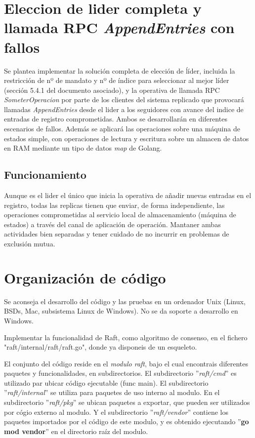 \documentclass{unizarpractice}
\begin{document}
\section{Eleccion de lider completa y llamada RPC \textit{AppendEntries} con fallos}

Se plantea implementar la solución completa de elección de ĺíder, incluida la restricción de nº de mandato y nº de índice para seleccionar al mejor líder (sección 5.4.1 del documento asociado), y la operativa de llamada RPC \textit{SometerOperacion} por parte de los clientes del sistema replicado que provocará llamadas \textit{AppendEntries} desde el lider a los seguidores con avance del indice de entradas de registro comprometidas. Ambos se desarrollarán en diferentes escenarios de fallos. Además se aplicará las operaciones sobre una máquina de estados simple, con operaciones de lectura y escritura sobre un almacen de datos en RAM mediante un tipo de datos \textit{map} de Golang.

\subsection{Funcionamiento}

Aunque es el lider el único que inicia la operativa de añadir nuevas entradas en el registro, todas las replicas tienen que enviar, de forma independiente, las operaciones comprometidas al servicio local de almacenamiento (máquina de estados) a través del canal de aplicación de operación. Mantaner ambas actividades bien separadas y tener cuidado de no incurrir en problemas de exclusión mutua.

\section{Organización de código}

Se aconseja el desarrollo del código y las pruebas en un ordenador Unix (Linux, BSDs, Mac, subsistema Linux de Windows). No se da soporte a desarrollo en Windows.

Implementar la funcionalidad de Raft, como algoritmo de consenso, en el fichero "raft/internal/raft/raft.go", donde ya disponeis de un esqueleto.

El conjunto del código reside en el \textit{modulo raft}, bajo el cual encontrais diferentes paquetes y funcionalidades, en subdirectorios. El subdirectorio ''\textit{raft/cmd}''  es utilizado par ubicar código ejecutable (func main). El subdirectorio ''\textit{raft/internal}'' se utiliza para paquetes de uso interno al modulo. En el subdirectorio ''\textit{raft/pkg}'' se ubican paquetes a exportar, que pueden ser utilizados por cógio externo al modulo. Y el subdirectorio ''\textit{raft/vendor}'' contiene los paquetes importados por el código de este modulo, y es obtenido ejecutando ''\textbf{go mod vendor}'' en el directorio raíz del modulo.
\end{document}
